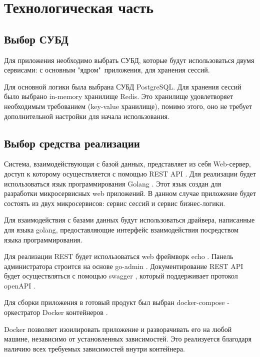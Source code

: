 \chapter{Технологическая часть}
%

\section{Выбор СУБД}
Для приложения необходимо выбрать СУБД, которые будут использоваться двумя сервисами:
с основным "ядром"\ приложения, для хранения сессий.

Для основной логики была выбрана СУБД PostgreSQL. Для хранения сессий было выбрано in-memory хранилище Redis.
Это хранилище удовлетворяет необходимым требованием (key-value хранилище), помимо этого, оно не требует дополнительной настройки для начала использования.

\section{Выбор средства реализации}
Система, взаимодействующая с базой данных, представляет из себя Web-сервер, доступ к которому осуществляется с помощью REST API \cite{rest-api}.  
Для реализации будет использоваться язык программирования Golang \cite{golang}. Этот язык
создан для разработки микросервисных web приложений. 
В данном случае приложение будет состоять из двух микросервисов: сервис сессий и сервис бизнес-логики. 

Для взаимодействия с базами данных будут использоваться драйвера, написанные для языка golang, предоставляющие интерфейс взаимодействия посредством языка программирования.  

Для реализации REST будет использоваться web фреймворк echo \cite{web-echo}. Панель администратора строится на основе go-admin \cite{go-admin}. Документирование REST API будет осуществляться с помощью swagger \cite{swagger}, который поддерживает протокол openAPI \cite{openapi}.

Для сборки приложения в готовый продукт был выбран docker-compose \cite{docker-compose} - оркестратор Docker контейнеров \cite{docker}.

Docker позволяет изоилировать приложение и разворачивать его на любой машине, независимо от установленных зависимостей. Это реализуется благодаря наличию всех требуемых зависимостей внутри контейнера. 

